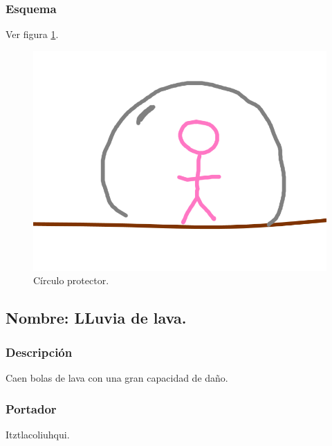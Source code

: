 \documentclass[11pt,letterpaper]{article}
\begin{document}
\subsubsection{Esquema}
			Ver figura \ref{fig:circuloP}.
			\begin{figure}
				\centering
				\includegraphics[height=0.2 \textheight]{Imagenes/circuloP}
				\caption{Círculo protector.}
				\label{fig:circuloP}
			\end{figure}
\subsection{Nombre: LLuvia de lava.}
\subsubsection{Descripción}
Caen bolas de lava con una gran capacidad de daño.
\subsubsection{Portador}
Itztlacoliuhqui.	
\end{document}

